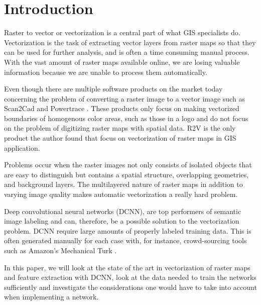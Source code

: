 \chapter{Introduction}
 Raster to vector or vectorization is a central part of what GIS specialists do. Vectorization is the task of extracting vector layers from raster maps so that they can be used for further analysis, and is often a time consuming manual process. With the vast amount of raster maps available online, we are losing valuable information because we are unable to process them automatically.
 
 Even though there are multiple software products on the market today concerning the problem of converting a raster image to a vector image such as Scan2Cad \cite{scan2cad2009} and Powertrace \cite{powertrace2016}. These products only focus on making vectorized boundaries of homogenous color areas, such as those in a logo and do not focus on the problem of digitizing raster maps with spatial data. R2V \cite{Wu1999} is the only product the author found that focus on vectorization of raster maps in GIS application. 
 
 Problems occur when the raster images not only consists of isolated objects that are easy to distinguish but contains a spatial structure, overlapping geometries, and background layers. The multilayered nature of raster maps in addition to varying image quality makes automatic vectorization a really hard problem.
 
 Deep convolutional neural networks (DCNN), are top performers of semantic image labeling \citet{Krizhevsky2012} and can, therefore, be a possible solution to the vectorization problem. DCNN require large amounts of properly labeled training data. This is often generated manually for each case with, for instance, crowd-sourcing tools such as Amazon's Mechanical Turk \cite{Krizhevsky2012}.
 
 In this paper, we will look at the state of the art in vectorization of raster maps and feature extraction with DCNN, look at the data needed to train the networks sufficiently and investigate the considerations one would have to take into account when implementing a network.
